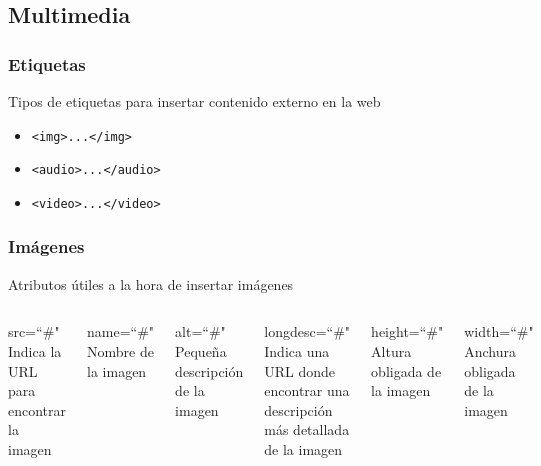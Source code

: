 \documentclass{beamer}
\begin{document}
	\subsection{Multimedia}
\begin{frame}[fragile]
\frametitle{Etiquetas}
	Tipos de etiquetas para insertar contenido externo en la web
	\begin{itemize}
	\item \verb|<img>...</img>|
	\item \verb|<audio>...</audio>|
	\item \verb|<video>...</video>|
	\end{itemize}
\end{frame}

\begin{frame}[fragile]
\frametitle{Imágenes}
	Atributos útiles a la hora de insertar imágenes
	\begin{columns}[c]
	\begin{block}{src=``\#"}
	Indica la URL para encontrar la imagen
	\end{block}
	\begin{block}{name=``\#"}
	Nombre de la imagen
	\end{block}
	\begin{block}{alt=``\#"}
	Pequeña descripción de la imagen
	\end{block}
	\begin{block}{longdesc=``\#"}
	Indica una URL donde encontrar una descripción más detallada de la imagen
	\end{block}
	\begin{block}{height=``\#"}
	Altura obligada de la imagen
	\end{block}
	\begin{block}{width=``\#"}
	Anchura obligada de la imagen
	\end{block}	
	\end{columns}
\end{frame}	
\end{document}
